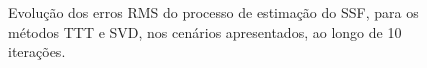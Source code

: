 \begin{figure}
    \vspace*{.5em}
    \caption{Evolução dos erros RMS do processo de estimação do SSF, para os métodos TTT e SVD, nos cenários apresentados, ao longo de 10 iterações.}
    \label{fig:appA:tt_ssf_rms_errors}
\end{figure}